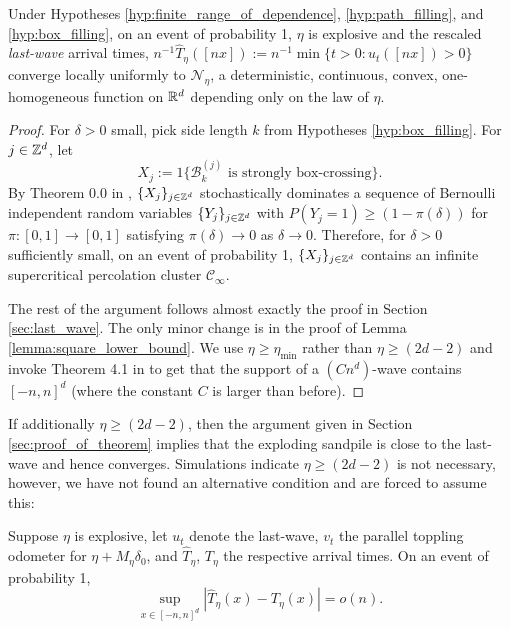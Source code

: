 \documentclass[12pt]{amsart}
\begin{document}
\begin{prop} \label{prop:convergence_of_the_generalized_last_wave}
	Under Hypotheses \ref{hyp:finite_range_of_dependence}, \ref{hyp:path_filling}, and \ref{hyp:box_filling},
	on an event of probability 1, $\eta$ is explosive and the rescaled {\it last-wave} arrival times, $n^{-1} \hat{T}_{\eta}([nx]) := n^{-1} \min \{ t > 0 : u_t([nx]) > 0\}$ converge locally uniformly to $\mathcal{N}_{\eta}$, a deterministic, continuous, convex, one-homogeneous function on $\mathbb{R}^d$
	depending only on the law of $\eta$.
\end{prop}
\begin{proof}
	For $\delta > 0$ small, pick side length $k$ from Hypotheses \ref{hyp:box_filling}. 
	For $j \in \mathbb{Z}^d$, let 
	\[
	X_j := 1\{ \mathcal{B}^{(j)}_k  \mbox{ is strongly box-crossing} \}. 
	\]
	By Theorem 0.0 in \cite{liggett1997domination}, $\{X_j\}_{j \in \mathbb{Z}^d}$ stochastically dominates a sequence 
	of Bernoulli independent random variables $\{Y_j\}_{j \in \mathbb{Z}^d}$ with $P(Y_j = 1) \geq (1 - \pi(\delta))$ for $\pi:[0,1]\to[0,1]$
	satisfying $\pi(\delta) \to 0$ as $\delta \to 0$. Therefore, for $\delta > 0 $ sufficiently small, on an event of probability 1, $\{X_j\}_{j \in \mathbb{Z}^d}$ contains an infinite supercritical percolation cluster $\mathcal{C}_{\infty}$. 
	
	The rest of the argument follows almost exactly the proof in Section \ref{sec:last_wave}. 
	The only minor change is in the proof of Lemma \ref{lemma:square_lower_bound}. We use $\eta \geq \eta_{\min}$
	rather than $\eta \geq (2 d - 2)$ and invoke Theorem 4.1 in \cite{levine2009strong} to get that the support of a $(C n^d)$-wave
	contains $[-n,n]^d$ (where the constant $C$ is larger than before).
\end{proof}

If additionally $\eta \geq (2 d - 2)$, then the argument given in Section \ref{sec:proof_of_theorem} implies that the exploding
sandpile is close to the last-wave and hence converges. Simulations indicate $\eta \geq (2d - 2)$ is not necessary, however, we have not found an alternative condition and are forced to assume this: 

\begin{hyp} \label{hyp:wave_approximation}
	Suppose $\eta$ is explosive, let $u_t$ denote the last-wave, $v_t$ the parallel toppling odometer for $\eta + M_{\eta}  \delta_0$,
	and $\hat{T}_{\eta}$, $T_{\eta}$ the respective arrival times. On an event of probability 1, 
	\[
	\sup_{x \in [-n,n]^d} |\hat{T}_{\eta}(x)- T_{\eta}(x)| = o(n).
	\]
\end{hyp}
\end{document}
